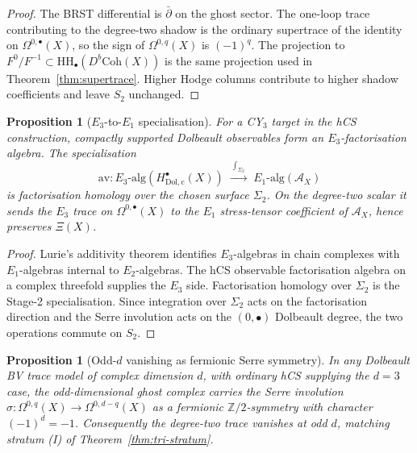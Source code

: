 \documentclass[11pt]{article}
\newtheorem{proposition}[theorem]{Proposition}
\providecommand{\Z}{\mathbb{Z}}
\providecommand{\cA}{\mathcal{A}}
\providecommand{\Coh}{\mathrm{Coh}}
\providecommand{\HH}{\mathrm{HH}}
\begin{document}
\begin{proof}
The BRST differential is \(\bar\partial\) on the ghost sector. The
one-loop trace contributing to the degree-two shadow is the ordinary
supertrace of the identity on \(\Omega^{0,\bullet}(X)\), so the sign of
\(\Omega^{0,q}(X)\) is \((-1)^q\). The projection to
\(F^0/F^{-1}\subset \HH_\bullet(D^b\Coh(X))\) is the same projection
used in Theorem~\ref{thm:supertrace}. Higher Hodge columns contribute
to higher shadow coefficients and leave \(S_2\) unchanged.
\end{proof}

\begin{proposition}[$E_{3}$-to-$E_{1}$ specialisation]
\label{prop:e3-avatar}
For a CY$_3$ target in the hCS construction, compactly supported
Dolbeault observables form an \(E_3\)-factorisation algebra. The
specialisation
\[
   \mathrm{av}\colon E_{3}\text{-}\mathrm{alg}(H^{\bullet}_{\mathrm{Dol,c}}(X))
   \;\xrightarrow{\;\int_{\Sigma_{2}}\;}\;E_{1}\text{-}\mathrm{alg}(\cA_{X})
\]
is factorisation homology over the chosen surface \(\Sigma_2\). On the
degree-two scalar it sends the \(E_3\) trace on
\(\Omega^{0,\bullet}(X)\) to the \(E_1\) stress-tensor coefficient of
\(\cA_X\), hence preserves \(\Xi(X)\).
\end{proposition}

\begin{proof}
Lurie's additivity theorem identifies $E_{3}$-algebras in
chain complexes with $E_{1}$-algebras internal to $E_{2}$-algebras.
The hCS observable factorisation algebra on a complex threefold supplies
the \(E_3\) side. Factorisation homology over \(\Sigma_2\) is the
Stage-2 specialisation. Since integration over \(\Sigma_2\) acts on the
factorisation direction and the Serre involution acts on the
\((0,\bullet)\) Dolbeault degree, the two operations commute on \(S_2\).
\end{proof}

\begin{proposition}[Odd-$d$ vanishing as fermionic Serre symmetry]
\label{prop:odd-d-ghost}
In any Dolbeault BV trace model of complex dimension \(d\), with
ordinary hCS supplying the \(d=3\) case, the odd-dimensional ghost
complex carries the Serre involution
$\sigma\colon\Omega^{0,q}(X)\to\Omega^{0,d-q}(X)$ as a fermionic
$\Z/2$-symmetry with character $(-1)^{d}=-1$. Consequently the
degree-two trace vanishes at odd \(d\), matching stratum (I) of
Theorem~\ref{thm:tri-stratum}.
\end{proposition}
\end{document}

